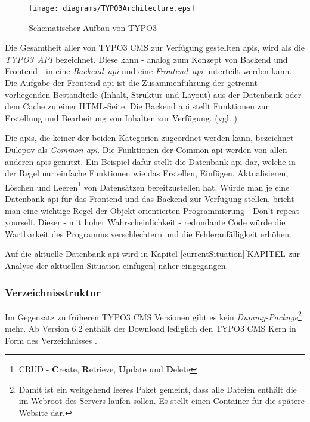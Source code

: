 \begin{figure}[H]
	\centering
	\texttt{[image: diagrams/TYPO3Architecture.eps]}
	\caption{Schematischer Aufbau von TYPO3}
	\label{fig:typo3Architecture}
\end{figure}

Die Gesamtheit aller von TYPO3 CMS zur Verfügung gestellten \gls{api}s, wird als die \mbox{\textit{TYPO3 API}} bezeichnet. Diese kann - analog zum Konzept von Backend und Frontend - in eine \mbox{\textit{Backend \gls{api}}} und eine \mbox{\textit{Frontend \gls{api}}} unterteilt werden kann. Die Aufgabe der Frontend \gls{api} ist die Zusammenführung der getrennt vorliegenden Bestandteile (Inhalt, Struktur und Layout) aus der Datenbank oder dem Cache zu einer HTML-Seite. Die Backend \gls{api} stellt Funktionen zur Erstellung und Bearbeitung von Inhalten zur Verfügung. (vgl. \cite[S. 5 ff.]{book:dulepovTypo32008})

Die \gls{api}s, die keiner der beiden Kategorien zugeordnet werden kann, bezeichnet Dulepov \cite[S. 5 ff.]{book:dulepovTypo32008} als \mbox{\textit{Common-\gls{api}}}. Die Funktionen der Common-\gls{api} werden von allen anderen \gls{api}s genutzt. Ein Beispiel dafür stellt die Datenbank \gls{api} dar, welche in der Regel nur einfache Funktionen wie das Erstellen, Einfügen, Aktualisieren, Löschen und Leeren\footnote{CRUD - {\bfseries C}reate, {\bfseries R}etrieve, {\bfseries U}pdate und {\bfseries D}elete} von Datensätzen bereitzustellen hat. Würde man je eine Datenbank \gls{api} für das Frontend und das Backend zur Verfügung stellen, bricht man eine wichtige Regel der Objekt-orientierten Programmierung - Don't repeat yourself. Dieser - mit hoher Wahrscheinlichkeit - redundante Code würde die Wartbarkeit des Programms verschlechtern und die Fehleranfälligkeit erhöhen.

Auf die aktuelle Datenbank-\gls{api} wird in Kapitel \ref{currentSituation}[KAPITEL zur Analyse der aktuellen Situation einfügen] näher eingegangen.

\subsubsection{Verzeichnisstruktur}

Im Gegensatz zu früheren TYPO3 CMS Versionen gibt es kein \mbox{\textit{Dummy-Package}}\footnote{Damit ist ein weitgehend leeres Paket gemeint, dass alle Dateien enthält die im Web\-root des Servers laufen sollen. Es stellt einen Container für die spätere Website dar.} mehr. Ab Version 6.2 enthält der Download lediglich den TYPO3 CMS Kern in Form des Verzeichnisses .

